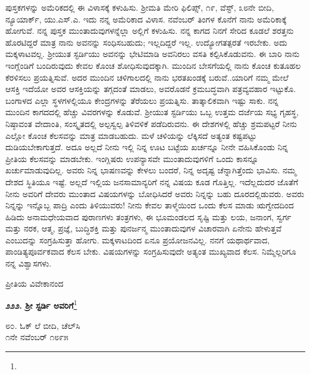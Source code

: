 ಪುಸ್ತಕಗಳನ್ನು ಅಮೆರಿಕದಲ್ಲಿ ಈ ವಿಳಾಸಕ್ಕೆ ಕಳುಹಿಸು. ಶ‍್ರೀಮತಿ ಮೇರಿ ಫಿಲಿಪ್ಸ್, ೧೯, ವೆಸ್ಟ್, ೩೮ನೇ ಬೀದಿ, ನ್ಯೂಯಾರ್ಕ್, ಯು.ಎಸ್.ಎ. ಇದು ನನ್ನ ಅಮೆರಿಕಾದ ವಿಳಾಸ. ನವೆಂಬರ್ ತಿಂಗಳ ಕೊನೆಗೆ ನಾನು ಅಮೆರಿಕಾಕ್ಕೆ ಹೋಗುವೆ. ನನ್ನ ಪುಸ್ತಕ ಮುಂತಾದುವುಗಳನ್ನೆಲ್ಲಾ ಅಲ್ಲಿಗೆ ಕಳುಹಿಸು. ನನ್ನ ಕಾಗದ ನಿನಗೆ ಸೇರಿದ ಕೂಡಲೆ ಶರತ್ತನು ಹೊರಟಿದ್ದರೆ ಮಾತ್ರ ನಾನು ಅವನನ್ನು ಸಂಧಿಸಬಹುದು; ಇಲ್ಲದಿದ್ದರೆ ಇಲ್ಲ. ಉದ್ಯೋಗತತ್ಪರತೆ ಇರಬೇಕು. ಅದು ಮಕ್ಕಳಾಟವಲ್ಲ. ಶ‍್ರೀಯುತ ಸ್ಟರ್ಡಿಯು ಅವನನ್ನು ಭೇಟಿಮಾಡಿ ಅವನಿರಲು ವಸತಿ ಕಲ್ಪಿಸಿಕೊಡುವನು. ಈ ಬಾರಿ ನಾನು ಇಂಗ್ಲೆಂಡಿಗೆ ಬಂದಿರುವುದು ಕೇವಲ ಕೊಂಚ ಶೋಧಿಸುವುದಕ್ಕಾಗಿ. ಮುಂದಿನ ಬೇಸಗೆಯಲ್ಲಿ ನಾನು ಕೊಂಚ ಕುತೂಹಲ ಕೆರಳಿಸಲು ಪ್ರಯತ್ನಿಸುವೆ. ಅದರ ಮುಂದಿನ ಚಳಿಗಾಲದಲ್ಲಿ ನಾನು ಭರತಖಂಡಕ್ಕೆ ಬರುವೆ..ಯಾರಿಗೆ ನಮ್ಮ ಮೇಲೆ ಆಸಕ್ತಿ ಇದೆಯೋ ಅವರ ಆಸಕ್ತಿಯನ್ನು ತಗ್ಗದಂತೆ ಮಾಡಲು, ಅವರೊಡನೆ ಕ್ರಮಬದ್ಧವಾಗಿ ಪತ್ರವ್ಯವಹಾರ ಇಟ್ಟುಕೊ. ಬಂಗಾಳದ ಎಲ್ಲಾ ಸ್ಥಳಗಳಲ್ಲಿಯೂ ಕೇಂದ್ರಗಳನ್ನು ತೆರೆಯಲು ಪ್ರಯತ್ನಿಸು. ತಾತ್ಕಾಲಿಕವಾಗಿ ಇಷ್ಟು ಸಾಕು. ನನ್ನ ಮುಂದಿನ ಕಾಗದದಲ್ಲಿ ಹೆಚ್ಚು ವಿವರಗಳನ್ನು ಕೊಡುವೆ. ಶ‍್ರೀಯುತ ಸ್ಟರ್ಡಿಯು ಒಬ್ಬ ಉತ್ತಮ ದರ್ಜೆಯ ಸಭ್ಯ ಗೃಹಸ್ಥ, ನಿಷ್ಠಾವಂತ ವೇದಾಂತಿ, ಸಂಸ್ಕೃತದಲ್ಲಿ ಅಲ್ಪಸ್ವಲ್ಪ ತಿಳಿವಳಿಕೆ ಪಡೆದಿರುವನು. ಈ ದೇಶಗಳಲ್ಲಿ ಹೆಚ್ಚು ಶ್ರಮಪಟ್ಟರೆ ನೀನು ಎಲ್ಲೋ ಕೊಂಚ ಕೆಲಸವನ್ನು ಮಾತ್ರ ಮಾಡಬಹುದು. ಮಳೆ ಚಳಿಯನ್ನು ಲೆಕ್ಕಿಸದೆ ಅತ್ಯಂತ ಕಷ್ಟಪಟ್ಟು ದುಡಿಯಬೇಕಾಗುತ್ತದೆ. ಅದೂ ಅಲ್ಲದೆ ನೀನು ಇಲ್ಲಿ ನಿನ್ನ ಊಟ ಬಟ್ಟೆಯ ಖರ್ಚನ್ನೂ ನೀನೇ ವಹಿಸಿಕೊಂಡು ನಿನ್ನ ಪ್ರೀತಿಯ ಕೆಲಸವನ್ನು ಮಾಡಬೇಕು. ಇಂಗ್ಲಿಷರು ಉಪನ್ಯಾಸವೇ ಮುಂತಾದುವುಗಳಿಗೆ ಒಂದು ಕಾಸನ್ನೂ ಖರ್ಚುಮಾಡುವುದಿಲ್ಲ. ಅವರು ನಿನ್ನ ಭಾಷಣವನ್ನು ಕೇಳಲು ಬಂದರೆ, ನಿನ್ನ ಅದೃಷ್ಟ ಚೆನ್ನಾಗಿತ್ತೆಂದು ಭಾವಿಸು. ನಮ್ಮ ದೇಶದ ಸ್ಥಿತಿಯೂ ಇಷ್ಟೆ. ಅಲ್ಲದೆ ಇಲ್ಲಿಯ ಜನಸಾಮಾನ್ಯರಿಗೆ ನನ್ನ ವಿಷಯ ಕೂಡ ಗೊತ್ತಿಲ್ಲ. ಇದೆಲ್ಲದುದರ ಜೊತೆಗೆ ನೀನು ಅವರಿಗೆ ದೇವರು ಮುಂತಾದ ವಿಷಯಗಳನ್ನು ಬೋಧಿಸಿದರೆ ಅವರು ನಿನ್ನನ್ನು ಬಹು ದೂರದಲ್ಲಿಡುವರು. ಅವರು ನಿನ್ನನ್ನು ಇನ್ನೊಬ್ಬ ಪಾದ್ರಿ ಎಂದು ತಿಳಿಯುವರು! ನೀನು ಕೇವಲ ತಾಳ್ಮೆಯಿಂದ ಒಂದು ಕೆಲಸ ಮಾಡು\enginline{-} ಋಗ್ವೇದದಿಂದ ಹಿಡಿದು ಅನಾಮಧೇಯವಾದ ಪುರಾಣಗಳು ತಂತ್ರಗಳು, ಈ ಭೂಮಂಡಲದ ಸೃಷ್ಟಿ ಮತ್ತು ಲಯ, ಜನಾಂಗ, ಸ್ವರ್ಗ ಮತ್ತು ನರಕ, ಆತ್ಮ, ಪ್ರಜ್ಞೆ, ಬುದ್ಧಿಶಕ್ತಿ ಮತ್ತು ಪುನರ್ಜನ್ಮ ಮುಂತಾದುವುಗಳ ವಿಚಾರವಾಗಿ ಏನೇನು ಹೇಳುತ್ತವೆ ಎಂಬುದನ್ನು ಸಂಗ್ರಹಿಸುತ್ತಾ ಹೋಗು. ಮಕ್ಕಳಾಟದಿಂದ ಏನೂ ಪ್ರಯೋಜನವಿಲ್ಲ. ನನಗೆ ಯಥಾರ್ಥವಾದ, ಪಾಂಡಿತ್ಯಪೂರ್ವಕವಾದ ಕೆಲಸ ಬೇಕು. ವಿಷಯಗಳನ್ನು ಸಂಗ್ರಹಿಸುವುದೇ ಅತ್ಯಂತ ಮುಖ್ಯವಾದ ಕೆಲಸ. ನಿಮ್ಮೆಲ್ಲರಿಗೂ ನನ್ನ ವಿಶ್ವಾಸಗಳು.

\vspace{-0.5cm}

{\flushright
ಪ್ರೀತಿಯ ವಿವೇಕಾನಂದ\par}

\begin{center}
\textbf{೨೨೨. ಶ‍್ರೀ ಸ್ಟರ್ಡಿ ಅವರಿಗೆ}\footnote{}
\end{center}

\vspace{-0.6cm}

\begin{flushright}
೮೦. ಓಕ್ ಲೆ ಬೀದಿ, ಚೆಲ್‌ಸಿ\\೧ನೇ ನವೆಂಬರ್ ೧೮೯೫
\end{flushright}

